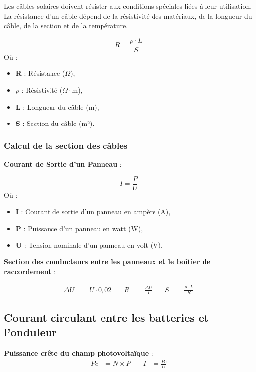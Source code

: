 Les câbles solaires doivent résister aux conditions spéciales liées à leur utilisation. La résistance d’un câble dépend de la résistivité des matériaux, de la longueur du câble, de la section et de la température.

\begin{equation}
R = \frac{\rho \cdot L}{S}
\end{equation}
Où :
	\begin{itemize}
	\item \textbf{R} : Résistance (\(\Omega\)),
	\item \textbf{\(\rho\)} : Résistivité (\(\Omega \cdot\)m),
	\item \textbf{L} : Longueur du câble (m),
	\item \textbf{S} : Section du câble (m²).
\end{itemize}



\subsubsection{Calcul de la section des câbles}

\textbf{Courant de Sortie d’un Panneau} :

	\begin{equation}
I = \frac{P}{U}
\end{equation}
Où :
	\begin{itemize}
	\item \textbf{I} : Courant de sortie d’un panneau en ampère (A),
	\item \textbf{P} : Puissance d’un panneau en watt (W),
	\item \textbf{U} : Tension nominale d’un panneau en volt (V).
\end{itemize}

\textbf{Section des conducteurs entre les panneaux et le boîtier de raccordement} :

\begin{align*}
\Delta U &= U \cdot 0{,}02 & \quad R &= \frac{\Delta U}{I} & \quad S &= \frac{\rho \cdot L}{R}
\end{align*}
\subsection{Courant circulant entre les batteries et l’onduleur}

\textbf{Puissance crête du champ photovoltaïque} :
\begin{align}
Pc &= N \times P & \quad I &= \frac{Pc}{U}
\end{align}


